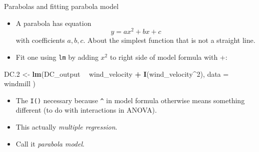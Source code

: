 \documentclass[ignorenonframetext,]{beamer}
\newenvironment{Shaded}{\begin{snugshade}}{\end{snugshade}}
\newcommand{\DataTypeTok}[1]{\textcolor[rgb]{0.13,0.29,0.53}{#1}}
\newcommand{\DecValTok}[1]{\textcolor[rgb]{0.00,0.00,0.81}{#1}}
\newcommand{\FloatTok}[1]{\textcolor[rgb]{0.00,0.00,0.81}{#1}}
\newcommand{\KeywordTok}[1]{\textcolor[rgb]{0.13,0.29,0.53}{\textbf{#1}}}
\newcommand{\NormalTok}[1]{#1}
\newcommand{\OperatorTok}[1]{\textcolor[rgb]{0.81,0.36,0.00}{\textbf{#1}}}
\newcommand{\StringTok}[1]{\textcolor[rgb]{0.31,0.60,0.02}{#1}}
\providecommand{\tightlist}{%
  \setlength{\itemsep}{0pt}\setlength{\parskip}{0pt}}
\begin{document}
\begin{frame}[fragile]{Parabolas and fitting parabola model}
\protect\hypertarget{parabolas-and-fitting-parabola-model}{}

\begin{itemize}
\tightlist
\item
  A parabola has equation \[y = ax^2 + bx + c\] with coefficients
  \(a, b, c\). About the simplest function that is not a straight line.
\item
  Fit one using \texttt{lm} by adding \(x^2\) to right side of model
  formula with +:
\end{itemize}

\begin{Shaded}
\begin{Highlighting}[]
\NormalTok{DC}\FloatTok{.2}\NormalTok{ <-}\StringTok{ }\KeywordTok{lm}\NormalTok{(DC_output }\OperatorTok{~}\StringTok{ }\NormalTok{wind_velocity }\OperatorTok{+}\StringTok{ }\KeywordTok{I}\NormalTok{(wind_velocity}\OperatorTok{^}\DecValTok{2}\NormalTok{),}
  \DataTypeTok{data =}\NormalTok{ windmill}
\NormalTok{)}
\end{Highlighting}
\end{Shaded}

\begin{itemize}
\tightlist
\item
  The \texttt{I()} necessary because \texttt{\^{}} in model formula
  otherwise means something different (to do with interactions in
  ANOVA).
\item
  This actually \emph{multiple regression}.
\item
  Call it \emph{parabola model}.
\end{itemize}

\end{frame}
\end{document}
